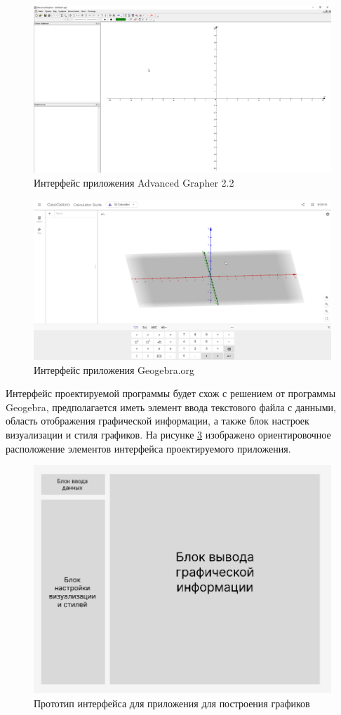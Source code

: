 \begin{figure}[h!]
    \center
    \includegraphics[scale=0.3]{fig/adgrapher.png}
    \caption{Интерфейс приложения Advanced Grapher 2.2}
    \label{fig:8}
\end{figure}

\begin{figure}[h!]
    \center
    \includegraphics[scale=0.3]{fig/Geogebra.png}
    \caption{Интерфейс приложения Geogebra.org}
    \label{fig:9}
\end{figure}

Интерфейс проектируемой программы будет схож с решением от программы Geogebra, предполагается иметь элемент ввода текстового файла с данными, область отображения графической информации, а также блок настроек визуализации и стиля графиков. На рисунке \ref{fig:10} изображено ориентировочное расположение элементов интерфейса проектируемого приложения.

\begin{figure}[h!]
    \center
    \includegraphics[scale=0.7]{fig/interface_prototype.png}
    \caption{Прототип интерфейса для приложения для построения графиков}
    \label{fig:10}
\end{figure}